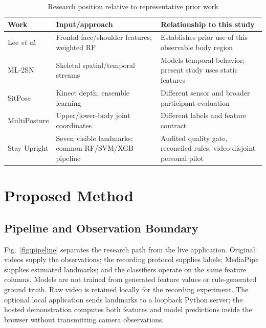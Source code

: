 \documentclass[conference]{IEEEtran}
\newcommand{\smalltable}{\setlength{\tabcolsep}{3.5pt}\renewcommand{\arraystretch}{1.12}\footnotesize}
\begin{document}
\begin{table}[t]
\caption{Research position relative to representative prior work}
\label{tab:position}\centering\smalltable
\begin{tabular}{p{}p{}p{}}
\toprule Work & Input/approach & Relationship to this study\\\midrule
Lee \emph{et al.} \cite{weightedrf} & Frontal face/shoulder features; weighted RF & Establishes prior use of this observable body region\\
ML-2SN \cite{ml2sn} & Skeletal spatial/temporal streams & Models temporal behavior; present study uses static features\\
SitPose \cite{sitpose} & Kinect depth; ensemble learning & Different sensor and broader participant evaluation\\
MultiPosture \cite{multiposture} & Upper/lower-body joint coordinates & Different labels and feature contract\\
Stay Upright & Seven visible landmarks; common RF/SVM/XGB pipeline & Audited quality gate, reconciled rules, video-disjoint personal pilot\\\bottomrule
\end{tabular}
\end{table}

\section{Proposed Method}
\subsection{Pipeline and Observation Boundary}
Fig.~\ref{fig:pipeline} separates the research path from the live application. Original videos supply the observations; the recording protocol supplies labels; MediaPipe supplies estimated landmarks; and the classifiers operate on the same feature columns. Models are not trained from generated feature values or rule-generated ground truth. Raw video is retained locally for the recording experiment. The optional local application sends landmarks to a loopback Python server; the hosted demonstration computes both features and model predictions inside the browser without transmitting camera observations.
\end{document}
